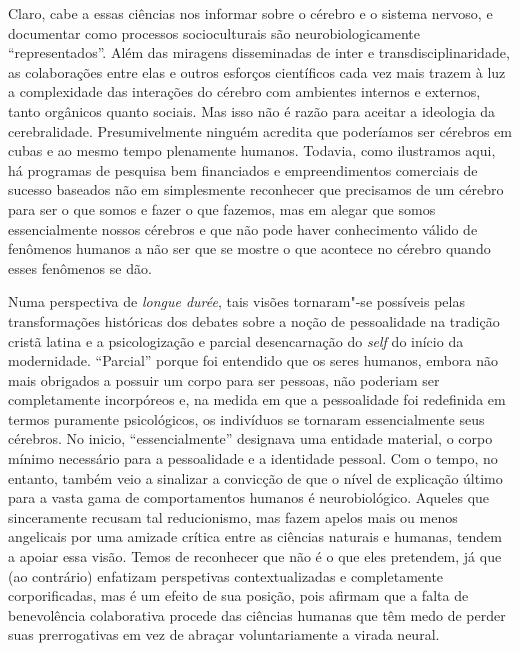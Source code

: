 Claro, cabe a essas ciências nos informar sobre o cérebro e o sistema
nervoso, e documentar como processos socioculturais são
neurobiologicamente ``representados''. Além das miragens disseminadas de
inter e transdisciplinaridade, as colaborações entre elas e outros
esforços científicos cada vez mais trazem à luz a complexidade das
interações do cérebro com ambientes internos e externos, tanto orgânicos
quanto sociais. Mas isso não é razão para aceitar a ideologia da
cerebralidade. Presumivelmente ninguém acredita que poderíamos ser
cérebros em cubas e ao mesmo tempo plenamente humanos. Todavia, como
ilustramos aqui, há programas de pesquisa bem financiados e
empreendimentos comerciais de sucesso baseados não em simplesmente
reconhecer que precisamos de um cérebro para ser o que somos e fazer o
que fazemos, mas em alegar que somos essencialmente nossos cérebros e
que não pode haver conhecimento válido de fenômenos humanos a não ser
que se mostre o que acontece no cérebro quando esses fenômenos se dão.

Numa perspectiva de \emph{longue durée}, tais visões tornaram"-se
possíveis pelas transformações históricas dos debates sobre a noção de
pessoalidade na tradição cristã latina e a psicologização e parcial
desencarnação do \emph{self} do início da modernidade. ``Parcial'' porque foi
entendido que os seres humanos, embora não mais obrigados a possuir um
corpo para ser pessoas, não poderiam ser completamente incorpóreos e, na
medida em que a pessoalidade foi redefinida em termos puramente
psicológicos, os indivíduos se tornaram essencialmente seus cérebros. No
inicio, ``essencialmente'' designava uma entidade material, o corpo
mínimo necessário para a pessoalidade e a identidade pessoal. Com o
tempo, no entanto, também veio a sinalizar a convicção de que o nível de
explicação último para a vasta gama de comportamentos humanos é
neurobiológico. Aqueles que sinceramente recusam tal reducionismo, mas
fazem apelos mais ou menos angelicais por uma amizade crítica entre as
ciências naturais e humanas, tendem a apoiar essa visão. Temos de
reconhecer que não é o que eles pretendem, já que (ao contrário)
enfatizam perspetivas contextualizadas e completamente corporificadas,
mas é um efeito de sua posição, pois afirmam que a falta de benevolência
colaborativa procede das ciências humanas que têm medo de perder suas
prerrogativas em vez de abraçar voluntariamente a virada neural.

